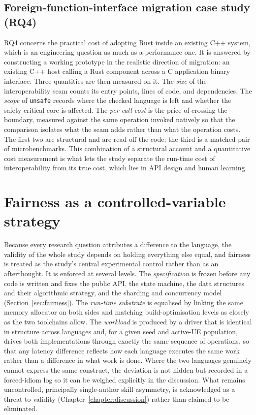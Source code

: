 \documentclass[english,twoside,openright,a4paper,censored,csm,software-track-2020]{HYthesisML}
\begin{document}
\subsection{Foreign-function-interface migration case study (RQ4)}\label{sec:methodffi}
RQ4 concerns the practical cost of adopting Rust inside an existing C++ system, which is an
engineering question as much as a performance one. It is answered by constructing a working
prototype in the realistic direction of migration: an existing C++ host calling a Rust
component across a C application binary interface. Three quantities are then measured on it.
The \emph{size} of the interoperability seam counts its entry points, lines of code, and
dependencies. The \emph{scope} of \texttt{unsafe} records where the checked language is left
and whether the safety-critical core is affected. The \emph{per-call cost} is the price of
crossing the boundary, measured against the same operation invoked natively so that the
comparison isolates what the seam adds rather than what the operation costs. The first two are
structural and are read off the code; the third is a matched pair of microbenchmarks.
This combination of a structural account and a quantitative cost measurement is what lets the
study separate the run-time cost of interoperability from its true cost, which lies in API
design and human learning.

\section{Fairness as a controlled-variable strategy}
Because every research question attributes a difference to the language, the validity of the
whole study depends on holding everything else equal, and fairness is treated as the study's
central experimental control rather than as an afterthought. It is enforced at several levels.
The \emph{specification} is frozen before any code is written and fixes the public API, the
state machine, the data structures and their algorithmic strategy, and the sharding and
concurrency model (Section~\ref{sec:fairness}). The \emph{run-time substrate} is equalised by
linking the same memory allocator on both sides and matching build-optimisation levels as
closely as the two toolchains allow. The \emph{workload} is produced by a driver that is
identical in structure across languages and, for a given seed and active-UE population, drives
both implementations through exactly the same sequence of operations, so that any latency
difference reflects how each language executes the same work rather than a difference in what
work is done. Where the two languages genuinely cannot express the same construct, the deviation
is not hidden but recorded in a forced-idiom log so it can be weighed explicitly in the
discussion. What remains uncontrolled, principally single-author skill asymmetry, is
acknowledged as a threat to validity (Chapter~\ref{chapter:discussion}) rather than claimed to
be eliminated.
\end{document}
